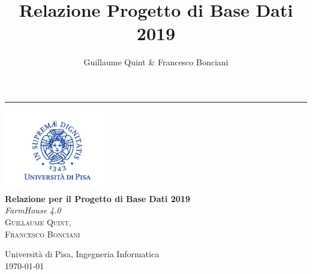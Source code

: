 \documentclass[12pt,a4paper]{article}
\author{Guillaume Quint \& Francesco Bonciani}
\title{Relazione Progetto di Base Dati 2019}
\begin{document}
\thispagestyle{empty}
\clearpage
{}
\renewcommand{\abstractname}{Visione d'insieme}



\begin{titlepage} %
	
	\raggedleft %
	
	\rule{1pt}{\textheight} %
	\hspace{0.05\textwidth} %
	\parbox[b]{0.75\textwidth}{ %
		\hspace*{-6cm}\vspace*{-2.7cm}\includegraphics[height=35mm]{logo_titolo_unipi}\\
		{\Huge\bfseries Relazione per il Progetto di Base Dati 2019}\\[2\baselineskip] %
		{\large\textit{FarmHouse 4.0}}\\[4\baselineskip] %
		{\Large\textsc{Guillaume Quint,\\ Francesco Bonciani}} %
		
		\vspace{0.5\textheight} %
		
		{\noindent Università di Pisa, Ingegneria Informatica\\\today}\\[\baselineskip] %
	}

\end{titlepage}
\end{document}
